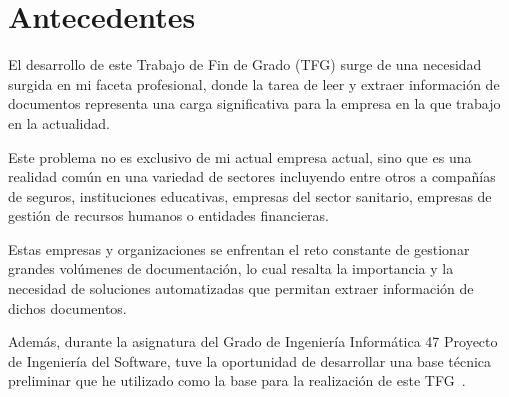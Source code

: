 \section{Antecedentes}

El desarrollo de este Trabajo de Fin de Grado (TFG) surge de una necesidad surgida en mi faceta profesional, donde la
tarea de leer y extraer información de documentos representa una carga significativa para la empresa en la que trabajo
en la actualidad.

Este problema no es exclusivo de mi actual empresa actual, sino que es una realidad común en una variedad de sectores
incluyendo entre otros a compañías de seguros, instituciones educativas, empresas del sector sanitario, empresas de
gestión de recursos humanos o entidades financieras.

Estas empresas y organizaciones se enfrentan el reto constante de gestionar grandes volúmenes de documentación, lo cual
resalta la importancia y la necesidad de soluciones automatizadas que permitan extraer información de dichos documentos.

Además, durante la asignatura del Grado de Ingeniería Informática 47 Proyecto de Ingeniería del Software, tuve la
oportunidad de desarrollar una base técnica preliminar que he utilizado como la base para la realización de este
TFG~\cite{url_viu_47_proyecto_ingenieria}.